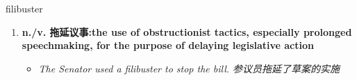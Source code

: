 
\begin{frame}
{\huge filibuster}
\begin{center}
\begin{enumerate}\Large
  \item \textbf{n./v. 拖延议事:the use of obstructionist tactics, especially prolonged speechmaking, for the purpose of delaying legislative action}
  \begin{itemize}
    \item \em{\Large{The Senator used a filibuster to stop the bill. 参议员拖延了草案的实施}}
  \end{itemize}
\end{enumerate}
\end{center}
\end{frame}

